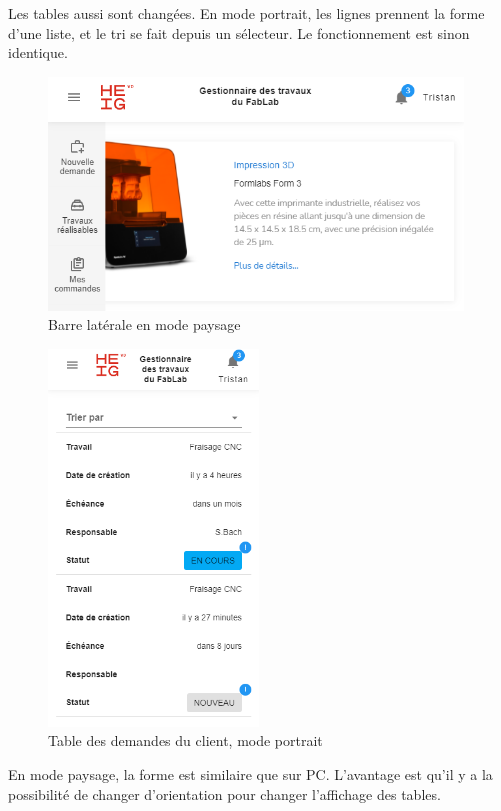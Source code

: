 \documentclass[
    iai, %
    eai, %
]{heig-tb}
\begin{document}
\newpage
Les tables aussi sont changées. En mode portrait, les lignes prennent la forme d'une liste, et le tri se fait depuis un sélecteur. Le fonctionnement est sinon identique.

\begin{figure}[h]
  \centering
  \includegraphics[width=11cm]{ui_mobile_landscape.PNG}
  \caption{Barre latérale en mode paysage}
\end{figure}

\begin{figure}[h]
  \centering
  \includegraphics[height=10cm]{ui_mobile_myjobs_client_portrait.PNG}
  \caption{Table des demandes du client, mode portrait}
\end{figure}

\newpage
En mode paysage, la forme est similaire que sur PC. L'avantage est qu'il y a la possibilité de changer d'orientation pour changer l'affichage des tables.
\end{document}
